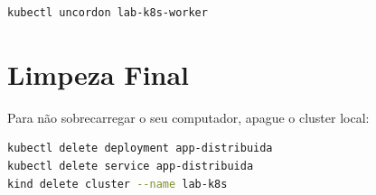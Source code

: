 \documentclass[11pt, a4paper]{article}
\begin{document}
\begin{lstlisting}[language=bash]
kubectl uncordon lab-k8s-worker
\end{lstlisting}

\section*{Limpeza Final}

Para não sobrecarregar o seu computador, apague o cluster local:

\begin{lstlisting}[language=bash]
kubectl delete deployment app-distribuida
kubectl delete service app-distribuida
kind delete cluster --name lab-k8s
\end{lstlisting}
\end{document}
